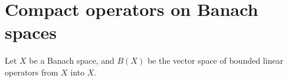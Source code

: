 

\section{Compact operators on Banach spaces}
\setcounter{theorem}{0}
\setcounter{equation}{0}


\renewcommand{\theenumi}{\roman{enumi}}
\renewcommand{\labelenumi}{\textnormal{(\theenumi)}$\;\;$}


\begin{theorem}\mbox{}
\vskip 0.1cm
\noindent
Let $X$ be a Banach space, and $B(X)$ be the vector space of bounded linear operators from $X$ into $X$.
\end{theorem}

